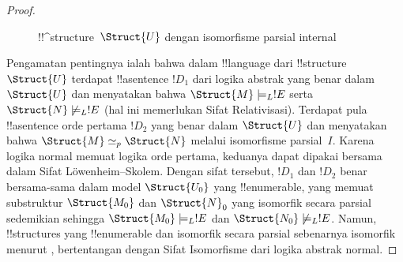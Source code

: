 \documentclass[../../../include/open-logic-section]{subfiles}
\begin{document}
\begin{proof}
\begin{figure}[h]
  \centering
  \caption{!!^{structure}~$\Struct{U}$ dengan isomorfisme parsial internal}
\end{figure}

Pengamatan pentingnya ialah bahwa dalam !!{language} dari
!!{structure}~$\Struct{U}$ terdapat !!a{sentence} $!D_1$ dari logika abstrak
yang benar dalam $\Struct{U}$ dan menyatakan bahwa $\Struct{M} \models_L
!E$ serta $\Struct{N} \not\models_L !E$ (hal ini memerlukan Sifat
Relativisasi). Terdapat pula !!a{sentence} orde pertama $!D_2$ yang benar
dalam $\Struct{U}$ dan menyatakan bahwa $\Struct{M} \simeq_p \Struct{N}$
melalui isomorfisme parsial~$I$. Karena logika normal memuat logika orde
pertama, keduanya dapat dipakai bersama dalam Sifat L\"owenheim--Skolem.
Dengan sifat tersebut, $!D_1$ dan $!D_2$ benar bersama-sama dalam model
$\Struct{U_0}$ yang !!{enumerable}, yang memuat substruktur $\Struct{M_0}$
dan $\Struct{N}_0$ yang isomorfik secara parsial sedemikian sehingga
$\Struct{M_0} \models_L !E$ dan $\Struct{N_0} \not\models_L !E$. Namun,
!!{structure}s yang !!{enumerable} dan isomorfik secara parsial sebenarnya
isomorfik menurut , bertentangan dengan Sifat
Isomorfisme dari logika abstrak normal.
\end{proof}
\end{document}
